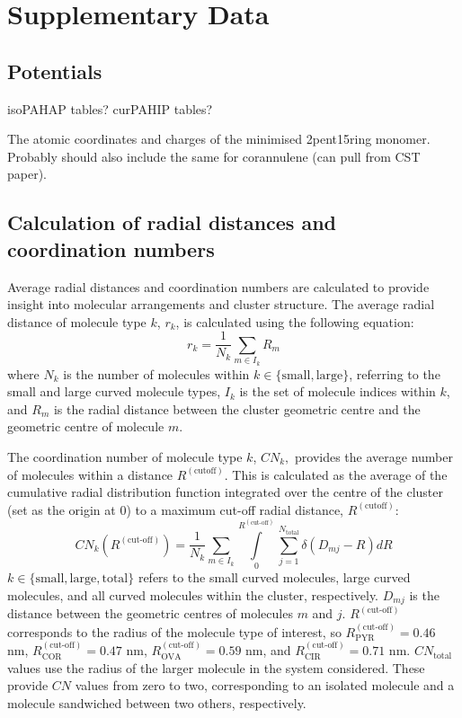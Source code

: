
\renewcommand{\thefigure}{A\arabic{figure}}
\setcounter{figure}{0}
\renewcommand{\thetable}{A\arabic{table}}
\setcounter{table}{0}

\section{Supplementary Data}
\label{supplinfo}


\subsection{Potentials}
isoPAHAP tables?
curPAHIP tables?

The atomic coordinates and charges of the minimised 2pent15ring monomer.
Probably should also include the same for corannulene (can pull from CST paper).

\subsection{Calculation of radial distances and coordination numbers}
\label{secSI:raddist_CN_eqns}
%
Average radial distances and coordination numbers are calculated to provide insight into molecular arrangements and cluster structure. The average radial distance of molecule type $k$, $r_{k}$, is calculated using the following equation:
\begin{equation}
    r_{k} = \frac{1}{N_{k}}\sum_{m \in I_{k}}R_{m}
\end{equation}
where $N_{k}$ is the number of molecules within $k \in \{\text{small},\text{large}\}$, referring to the small and large curved molecule types, $I_{k}$ is the set of molecule indices within $k$, and $R_{m}$ is the radial distance between the cluster geometric centre and the geometric centre of molecule $m$.

The coordination number of molecule type $k$, $CN_{k},$ provides the average number of molecules within a distance $R^{(\text{cutoff})}$. This is calculated as the average of the cumulative radial distribution function integrated over the centre of the cluster (set as the origin at 0) to a maximum cut-off radial distance, $R^{(\text{cutoff})}$:
\begin{equation}
    CN_{k}(R^{(\text{cut-off})}) = \frac{1}{N_{k}} \sum_{m \in I_{k}} \int\limits_{0}^{R^{(\text{cut-off})}}  \sum_{j=1}^{N_{\text{total}}} \delta(D_{mj} - R) dR
\end{equation}
$k \in \{\text{small}, \text{large}, \text{total}\}$ refers to the small curved molecules, large curved molecules, and all curved molecules within the cluster, respectively. $D_{mj}$ is the distance between the geometric centres of molecules $m$ and $j$. $R^{(\text{cut-off})}$ corresponds to the radius of the molecule type of interest, so $R^{(\text{cut-off})}_{\text{PYR}} = 0.46$ nm, $R^{(\text{cut-off})}_{\text{COR}} = 0.47$ nm, $R^{(\text{cut-off})}_{\text{OVA}} = 0.59$ nm, and $R^{(\text{cut-off})}_{\text{CIR}} = 0.71$ nm. $CN_{\text{total}}$ values use the radius of the larger molecule in the system considered. These provide $CN$ values from zero to two, corresponding to an isolated molecule and a molecule sandwiched between two others, respectively.


